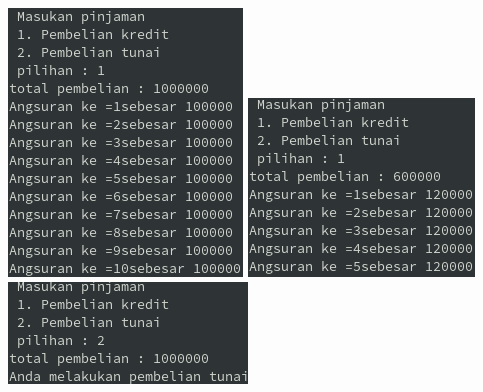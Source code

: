 \documentclass[a4paper,12pt]{article}
\begin{document}
\begin{center}
    \includegraphics[scale=.8]{3.png}
    \includegraphics[scale=.8]{4.png}
    \includegraphics[scale=.8]{5.png}
\end{center}
\end{document}

